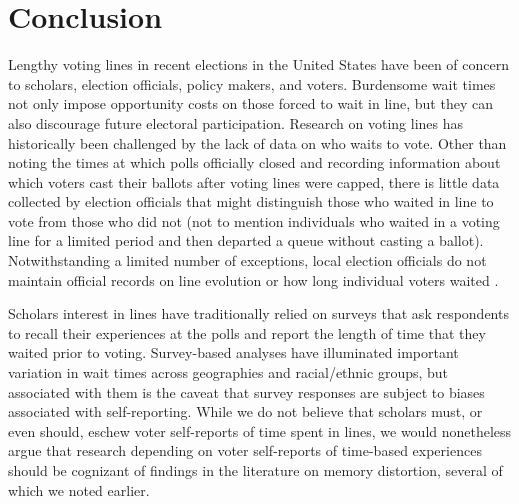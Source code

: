 \documentclass[12pt,titlepage]{article}
\begin{document}
\section*{Conclusion}




Lengthy voting lines in recent elections in the United States have
been of concern to scholars, election officials, policy makers, and
voters. Burdensome wait times not only impose opportunity costs on
those forced to wait in line, but they can also discourage future
electoral participation. Research on voting lines has historically
been challenged by the lack of data on who waits to vote. Other than
noting the times at which polls officially closed and recording
information about which voters cast their ballots after voting lines
were capped, there is little data collected by election officials that
might distinguish those who waited in line to vote from those who did
not (not to mention individuals who waited in a voting line for a
limited period and then departed a queue without casting a ballot).
Notwithstanding a limited number of exceptions, local election
officials do not maintain official records on line evolution or how
long individual voters waited \citep{herron:confidence}.


Scholars interest in lines have traditionally relied on surveys that
ask respondents to recall their experiences at the polls and report
the length of time that they waited prior to voting. Survey-based
analyses have illuminated important variation in wait times across
geographies and racial/ethnic groups, but associated with them is the
caveat that survey responses are subject to biases associated with
self-reporting. While we do not believe that scholars must, or even
should, eschew voter self-reports of time spent in lines, we would
nonetheless argue that research depending on voter self-reports of
time-based experiences should be cognizant of findings in the
literature on memory distortion, several of which we noted earlier.
\end{document}
